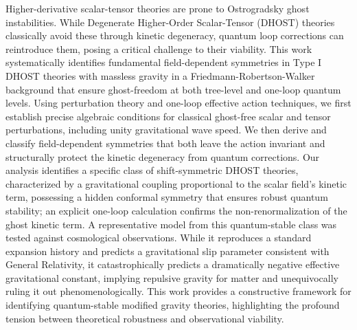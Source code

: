 \documentclass[twocolumn]{aastex631}
\begin{document}
Higher-derivative scalar-tensor theories are prone to Ostrogradsky ghost instabilities. While Degenerate Higher-Order Scalar-Tensor (DHOST) theories classically avoid these through kinetic degeneracy, quantum loop corrections can reintroduce them, posing a critical challenge to their viability. This work systematically identifies fundamental field-dependent symmetries in Type I DHOST theories with massless gravity in a Friedmann-Robertson-Walker background that ensure ghost-freedom at both tree-level and one-loop quantum levels. Using perturbation theory and one-loop effective action techniques, we first establish precise algebraic conditions for classical ghost-free scalar and tensor perturbations, including unity gravitational wave speed. We then derive and classify field-dependent symmetries that both leave the action invariant and structurally protect the kinetic degeneracy from quantum corrections. Our analysis identifies a specific class of shift-symmetric DHOST theories, characterized by a gravitational coupling proportional to the scalar field's kinetic term, possessing a hidden conformal symmetry that ensures robust quantum stability; an explicit one-loop calculation confirms the non-renormalization of the ghost kinetic term. A representative model from this quantum-stable class was tested against cosmological observations. While it reproduces a standard expansion history and predicts a gravitational slip parameter consistent with General Relativity, it catastrophically predicts a dramatically negative effective gravitational constant, implying repulsive gravity for matter and unequivocally ruling it out phenomenologically. This work provides a constructive framework for identifying quantum-stable modified gravity theories, highlighting the profound tension between theoretical robustness and observational viability.
\end{document}
